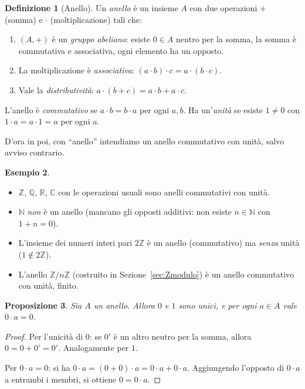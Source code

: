 \documentclass[11pt, a4paper]{book}
\theoremstyle{definition}
\newtheorem{definizione}{Definizione}[section]
\newtheorem{esempio}[definizione]{Esempio}
\theoremstyle{plain}
\newtheorem{proposizione}[definizione]{Proposizione}
\theoremstyle{remark}
\newcommand{\N}{\mathbb{N}}
\newcommand{\Z}{\mathbb{Z}}
\newcommand{\Q}{\mathbb{Q}}
\newcommand{\R}{\mathbb{R}}
\newcommand{\C}{\mathbb{C}}
\begin{document}
\begin{defbox}
\begin{definizione}[Anello]
Un \emph{anello} è un insieme $A$ con due operazioni $+$ (somma) e $\cdot$ (moltiplicazione) tali che:
\begin{enumerate}
  \item $(A, +)$ è un \emph{gruppo abeliano}: esiste $0 \in A$ neutro per la somma, la somma è commutativa e associativa, ogni elemento ha un opposto.
  \item La moltiplicazione è \emph{associativa}: $(a \cdot b) \cdot c = a \cdot (b \cdot c)$.
  \item Vale la \emph{distributività}: $a \cdot (b + c) = a \cdot b + a \cdot c$.
\end{enumerate}
L'anello è \emph{commutativo} se $a \cdot b = b \cdot a$ per ogni $a, b$. Ha un'\emph{unità} se esiste $1 \neq 0$ con $1 \cdot a = a \cdot 1 = a$ per ogni $a$.

D'ora in poi, con ``anello'' intendiamo un anello commutativo con unità, salvo avviso contrario.
\end{definizione}
\end{defbox}

\begin{exbox}
\begin{esempio}
\begin{itemize}
  \item $\Z$, $\Q$, $\R$, $\C$ con le operazioni usuali sono anelli commutativi con unità.
  \item $\N$ \emph{non} è un anello (mancano gli opposti additivi: non esiste $n \in \N$ con $1 + n = 0$).
  \item L'insieme dei numeri interi pari $2\Z$ è un anello (commutativo) ma \emph{senza} unità ($1 \notin 2\Z$).
  \item L'anello $\Z/n\Z$ (costruito in Sezione~\ref{sec:Zmodulo}) è un anello commutativo con unità, finito.
\end{itemize}
\end{esempio}
\end{exbox}

\begin{proposizione}
Sia $A$ un anello. Allora $0$ e $1$ sono unici, e per ogni $a \in A$ vale $0 \cdot a = 0$.
\end{proposizione}

\begin{proof}
Per l'unicità di $0$: se $0'$ è un altro neutro per la somma, allora $0 = 0 + 0' = 0'$. Analogamente per $1$.

Per $0 \cdot a = 0$: si ha $0 \cdot a = (0 + 0) \cdot a = 0 \cdot a + 0 \cdot a$. Aggiungendo l'opposto di $0 \cdot a$ a entrambi i membri, si ottiene $0 = 0 \cdot a$.
\end{proof}
\end{document}
